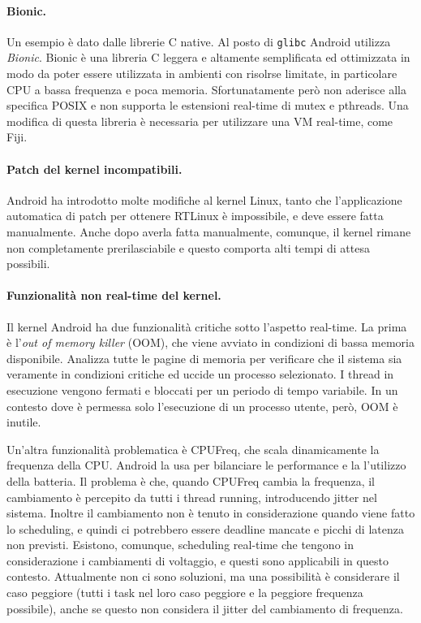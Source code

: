 \paragraph{Bionic.} Un esempio è dato dalle librerie C native. Al posto di \texttt{glibc} Android utilizza \textit{Bionic}. Bionic è una libreria C leggera e altamente semplificata ed ottimizzata in modo da poter essere utilizzata in ambienti con risolrse limitate, in particolare CPU a bassa frequenza e poca memoria. Sfortunatamente però non aderisce alla specifica POSIX e non supporta le estensioni real-time di mutex e pthreads. Una modifica di questa libreria è necessaria per utilizzare una VM real-time, come Fiji.

\paragraph{Patch del kernel incompatibili.} Android ha introdotto molte modifiche al kernel Linux, tanto che l'applicazione automatica di patch per ottenere RTLinux è impossibile, e deve essere fatta manualmente. Anche dopo averla fatta manualmente, comunque, il kernel rimane non completamente prerilasciabile e questo comporta alti tempi di attesa possibili. 

\paragraph{Funzionalità non real-time del kernel.} Il kernel Android ha due funzionalità critiche sotto l'aspetto real-time. La prima è l'\textit{out of memory killer} (OOM), che viene avviato in condizioni di bassa memoria disponibile. Analizza tutte le pagine di memoria per verificare che il sistema sia veramente in condizioni critiche ed uccide un processo selezionato. I thread in esecuzione vengono fermati e bloccati per un periodo di tempo variabile. In un contesto dove è permessa solo l'esecuzione di un processo utente, però, OOM è inutile.

Un'altra funzionalità problematica è CPUFreq, che scala dinamicamente la frequenza della CPU. Android la usa per bilanciare le performance e la l'utilizzo della batteria. Il problema è che, quando CPUFreq cambia la frequenza, il cambiamento è percepito da tutti i thread running, introducendo jitter nel sistema. Inoltre il cambiamento non è tenuto in considerazione quando viene fatto lo scheduling, e quindi ci potrebbero essere deadline mancate e picchi di latenza non previsti. Esistono, comunque, scheduling real-time che tengono in considerazione i cambiamenti di voltaggio, e questi sono applicabili in questo contesto. Attualmente non ci sono soluzioni, ma una possibilità è considerare il caso peggiore (tutti i task nel loro caso peggiore e la peggiore frequenza possibile), anche se questo non considera il jitter del cambiamento di frequenza.

